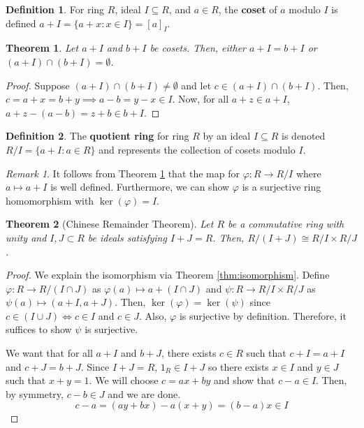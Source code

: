 \documentclass[
    parskip=half,
    toc=flat,
    toc=sectionentrydotfill,
]{scrartcl}  %
\theoremstyle{definition}
\newtheorem{definition}{Definition}[section]
\theoremstyle{plain}
\newtheorem{theorem}{Theorem}[definition]
\theoremstyle{remark}
\newtheorem{remark}{Remark}[definition]
\begin{document}
\begin{definition}
    For ring $R$, ideal $I\subseteq R$, and $a\in R$, the \textbf{coset} of $a$ modulo $I$ is
    defined $a+I=\{a+x:x\in I\}=[a]_I$.
\end{definition}

\begin{theorem}
    \label{thm:cosets disjoint}
    Let $a+I$ and $b+I$ be cosets.
    Then, either $a+I=b+I$ or $(a+I)\cap(b+I)=\emptyset$.
\end{theorem}

\begin{proof}
    Suppose $(a+I)\cap(b+I)\neq\emptyset$ and let $c\in(a+I)\cap(b+I)$.
    Then, $c=a+x=b+y\implies a-b=y-x\in I$.
    Now, for all $a+z\in a+I$, $a+z-(a-b)=z+b\in b+I$.
\end{proof}

\begin{definition}
    The \textbf{quotient ring} for ring $R$ by an ideal $I\subseteq R$ is denoted
    $R/I=\{a+I:a\in R\}$ and represents the collection of cosets modulo $I$.
\end{definition}

\begin{remark}
    It follows from Theorem \ref{thm:cosets disjoint} that the map for $\varphi:R\to R/I$ where
    $a\mapsto a+I$ is well defined.
    Furthermore, we can show $\varphi$ is a surjective ring homomorphism with $\ker(\varphi)=I$.
\end{remark}

\begin{theorem}[Chinese Remainder Theorem]
    Let $R$ be a commutative ring with unity and $I,J\subset R$ be ideals satisfying $I+J=R$.
    Then, $R/(I+J)\cong R/I\times R/J$.
\end{theorem}

\begin{proof}
    We explain the isomorphism via Theorem \ref{thm:isomorphism}.
    Define $\varphi:R\to R/(I\cap J)$ as $\varphi(a)\mapsto a+(I\cap J)$ and
    $\psi:R\to R/I\times R/J$ as $\psi(a)\mapsto(a+I,a+J)$.
    Then, $\ker(\varphi)=\ker(\psi)$ since $c\in(I\cup J)\iff c\in I$ and $c\in J$.
    Also, $\varphi$ is surjective by definition.
    Therefore, it suffices to show $\psi$ is surjective.

    We want that for all $a+I$ and $b+J$, there exists $c\in R$ such that $c+I=a+I$ and $c+J=b+J$.
    Since $I+J=R$, $1_R\in I+J$ so there exists $x\in I$ and $y\in J$ such that $x+y=1$.
    We will choose $c=ax+by$ and show that $c-a\in I$.
    Then, by symmetry, $c-b\in J$ and we are done.
    \[c-a=(ay+bx)-a(x+y)=(b-a)x\in I\]
\end{proof}
\end{document}
